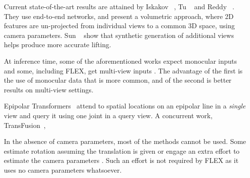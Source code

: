 
Current state-of-the-art results are attained by Iskakov \etal~\cite{iskakov2019learnable}, Tu \etal~\cite{tu2020voxelpose} and Reddy \etal~\cite{Reddy2021TesseTrackEL}. They use end-to-end networks, and present a volumetric approach, where 2D features are un-projected from individual views to a common 3D space, using camera parameters.
Sun \etal~ show that synthetic generation of additional views helps produce more accurate lifting. 

At inference time, some of the aforementioned works expect monocular inputs \cite{sym12071116,he2020epipolar,chen2019weaklysupervised,chu_and_pan_semisupervised} and some, including FLEX, get multi-view inputs \cite{iskakov2019learnable,tu2020voxelpose,qiu2019cross}. The advantage of the first is the use of monocular data that is more common, and of the second is better results on multi-view settings. 

Epipolar Transformers~\cite{he2020epipolar} attend to spatial locations on an epipolar line in a \emph{single} view and 
query it using one joint in a query view. 
A concurrent work, TransFusion~\cite{ma2021transfusion},

In the absence of camera parameters,
most of the methods cannot be used. Some estimate rotation assuming the translation is given \cite{kocabas2019selfsupervised,bachmann2019motion} or engage an extra effort to estimate the camera parameters \cite{chu_and_pan_semisupervised,wandt2020canonpose,chen2021deductive,usman2021metapose,human_pose_calib_unsync}. 
Such an effort is not required by FLEX as it uses no camera parameters whatsoever. %



